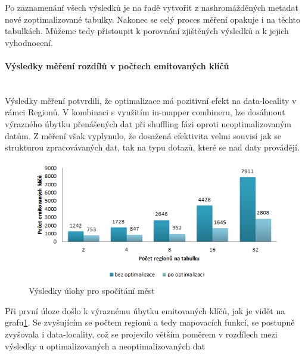 \documentclass[thesis=M,czech]{FITthesis}[2012/06/26]
\begin{document}
Po zaznamenání všech výsledků je na řadě vytvořit z nashromážděných metadat nové zoptimalizované tabulky. Nakonec se celý proces měření opakuje i na těchto tabulkách. Můžeme tedy přistoupit k porovnání zjištěných výsledků a k jejich vyhodnocení.

\paragraph{Výsledky měření rozdílů v počtech emitovaných klíčů} \hfill \\
Výsledky měření potvrdili, že optimalizace má pozitivní efekt na data-locality v rámci Regionů. V kombinaci s využitím in-mapper combineru, lze dosáhnout výrazného úbytku přenášených dat při shuffling fázi oproti neoptimalizovaným datům. Z měření však vyplynulo, že dosažená efektivita velmi souvisí jak se strukturou zpracovávaných dat, tak na typu dotazů, které se nad daty provádějí.

\begin{figure}[h]\centering
	\includegraphics[width=1\textwidth, angle=0]{files/mesta}
	\caption[Výsledky úlohy pro spočítání měst]
	{Výsledky úlohy pro spočítání měst}\label{fig:mesta}
\end{figure}

Při první úloze došlo k výraznému úbytku emitovaných klíčů, jak je vidět na grafu\ref{fig:mesta}. Se zvyšujícím se počtem regionů a tedy mapovacích funkcí, se postupně zvyšovala i data-locality, což se projevilo větším poměrem v rozdílech mezi výsledky u optimalizovaných a neoptimalizovaných dat
\end{document}
